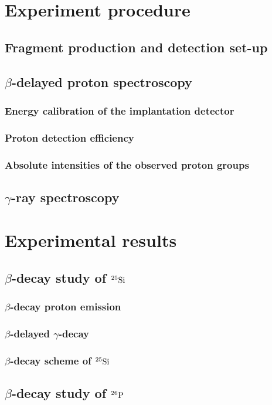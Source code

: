 \documentclass[UTF8]{ctexart}
\begin{document}
\section{Experiment procedure}
\subsection{Fragment production and detection set-up}
\subsection{$\beta$-delayed proton spectroscopy}
\subsubsection{Energy calibration of the implantation detector}
\subsubsection{Proton detection efficiency}
\subsubsection{Absolute intensities of the observed proton groups}
\subsection{$\gamma$-ray spectroscopy}
\section{Experimental results}
\subsection{$\beta$-decay study of $^{25}\textnormal{Si}$}
\subsubsection{$\beta$-decay proton emission}
\subsubsection{$\beta$-delayed $\gamma$-decay}
\subsubsection{$\beta$-decay scheme of $^{25}\textnormal{Si}$}
\subsection{$\beta$-decay study of $^{26}\textnormal{P}$}
\end{document}

